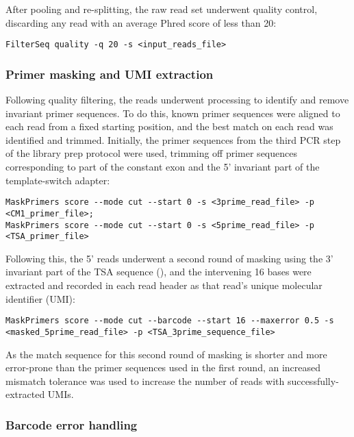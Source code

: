 {After pooling and re-splitting, the raw read set underwent quality control, discarding any read with an average Phred score of less than 20:

\begin{lstlisting}
FilterSeq quality -q 20 -s <input_reads_file>
\end{lstlisting}

\subsubsection{Primer masking and UMI extraction}
\label{sec:methods_comp_igpreproc_mask}

Following quality filtering, the reads underwent processing to identify and remove invariant primer sequences. To do this, known primer sequences were aligned to each read from a fixed starting position, and the best match on each read was identified and trimmed. Initially, the primer sequences from the third PCR step of the library prep protocol were used, trimming off primer sequences corresponding to part of the constant  exon and the 5' invariant part of the template-switch adapter:

\begin{lstlisting}
MaskPrimers score --mode cut --start 0 -s <3prime_read_file> -p <CM1_primer_file>;
MaskPrimers score --mode cut --start 0 -s <5prime_read_file> -p <TSA_primer_file>
\end{lstlisting}

Following this, the 5' reads underwent a second round of masking using the 3' invariant part of the TSA sequence (), and the intervening 16 bases were extracted and recorded in each read header as that read's unique molecular identifier (UMI):

\begin{lstlisting}
MaskPrimers score --mode cut --barcode --start 16 --maxerror 0.5 -s <masked_5prime_read_file> -p <TSA_3prime_sequence_file>
\end{lstlisting}

As the match sequence for this second round of masking is shorter and more error-prone than the primer sequences used in the first round, an increased mismatch tolerance was used to increase the number of reads with successfully-extracted UMIs.

\subsubsection{Barcode error handling}
\label{sec:methods_comp_igpreproc_correct}

}
